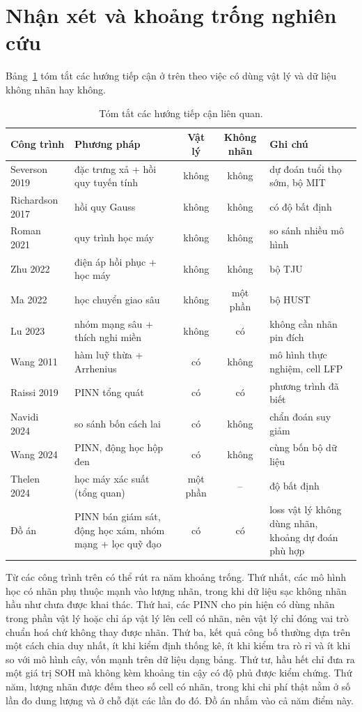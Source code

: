 \documentclass[12pt,a4paper,oneside]{report}
\theoremstyle{plain}
\theoremstyle{definition}
\begin{document}
\section{Nhận xét và khoảng trống nghiên cứu}

Bảng~\ref{tab:related} tóm tắt các hướng tiếp cận ở trên theo việc có dùng vật lý và dữ liệu không nhãn hay không.

\begin{table}[!htbp]\centering\small
\caption{Tóm tắt các hướng tiếp cận liên quan.}\label{tab:related}
\begin{tabularx}{\textwidth}{>{\raggedright}p{3.2cm}>{\raggedright}p{3.6cm}cc>{\raggedright\arraybackslash}X}
\toprule
Công trình & Phương pháp & Vật lý & Không nhãn & Ghi chú \\
\midrule
Severson 2019~\cite{severson2019} & đặc trưng xả + hồi quy tuyến tính & không & không & dự đoán tuổi thọ sớm, bộ MIT\\
Richardson 2017~\cite{richardson2017} & hồi quy Gauss & không & không & có độ bất định\\
Roman 2021~\cite{roman2021} & quy trình học máy & không & không & so sánh nhiều mô hình\\
Zhu 2022~\cite{zhu2022} & điện áp hồi phục + học máy & không & không & bộ TJU\\
Ma 2022~\cite{ma2022} & học chuyển giao sâu & không & một phần & bộ HUST\\
Lu 2023~\cite{lu2023} & nhóm mạng sâu + thích nghi miền & không & có & không cần nhãn pin đích\\
Wang 2011~\cite{wang2011lfp} & hàm luỹ thừa + Arrhenius & có & không & mô hình thực nghiệm, cell LFP\\
Raissi 2019~\cite{raissi2019} & PINN tổng quát & có & có & phương trình đã biết\\
Navidi 2024~\cite{navidi2024} & so sánh bốn cách lai & có & không & chẩn đoán suy giảm\\
Wang 2024~\cite{wang2024} & PINN, động học hộp đen & có & không & cùng bốn bộ dữ liệu\\
Thelen 2024~\cite{thelen2024} & học máy xác suất (tổng quan) & một phần & -- & độ bất định\\
Đồ án & PINN bán giám sát, động học xám, nhóm mạng + lọc quỹ đạo & có & có & loss vật lý không dùng nhãn,
khoảng dự đoán phù hợp\\
\bottomrule
\end{tabularx}
\end{table}

Từ các công trình trên có thể rút ra năm khoảng trống. Thứ nhất, các mô hình học có nhãn phụ thuộc mạnh vào
lượng nhãn, trong khi dữ liệu sạc không nhãn hầu như chưa được khai thác. Thứ hai, các PINN cho pin hiện có
dùng nhãn trong phần vật lý hoặc chỉ áp vật lý lên cell có nhãn, nên vật lý chỉ đóng vai trò chuẩn hoá chứ
không thay được nhãn. Thứ ba, kết quả công bố thường dựa trên một cách chia duy nhất, ít khi kiểm định
thống kê, ít khi kiểm tra rò rỉ và ít khi so với mô hình cây, vốn mạnh trên dữ liệu dạng bảng. Thứ tư, hầu hết
chỉ đưa ra một giá trị SOH mà không kèm khoảng tin cậy có độ phủ được kiểm chứng. Thứ năm, lượng nhãn được đếm theo
số cell có nhãn, trong khi chi phí thật nằm ở số lần đo dung lượng và ở chỗ đặt các lần đo đó. Đồ án nhắm vào cả năm
điểm này.
\end{document}
